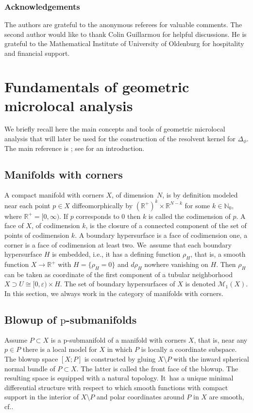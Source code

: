 \documentclass[11pt]{article}
\newcommand{\ie}{i.e.,\xspace}
\newcommand{\cf}{cf.\xspace}
\numberwithin{equation}{section}
\let\backslash\setminus
\newcommand{\rp}{\mathrm{p}}
\theoremstyle{plain}
\theoremstyle{definition}
\newcommand{\R}{{\mathbb{R}}}
\newcommand\calM{{\mathcal M}}
\let\eps\varepsilon
\begin{document}
\subsubsection*{Acknowledgements}
The authors are grateful to the anonymous referees for valuable comments. The second author would like to thank Colin Guillarmou
for helpful discussions. He is grateful to the Mathematical Institute of University of Oldenburg for hospitality and financial support.

\section{Fundamentals of geometric microlocal analysis}\label{sec:fund}
We briefly recall here the main concepts and tools of geometric microlocal analysis that will later be used
for the construction of the resolvent kernel for $\Delta_{\phi}$. The main reference
is \cite{melrose1993atiyah}; see \cite{Gri:BBC} for an introduction.

\subsection{Manifolds with corners}
A compact manifold with corners $X$, of dimension~$N$, is by definition modeled near each point $p\in X$ diffeomorphically by
\hbox{$(\mathbb{R}^+)^{k}\times\mathbb{R}^{N-k}$} for some $k \in \mathbb{N}_0$, where $\R^+=[0,\infty)$.
If $p$ corresponds to $0$ then $k$ is called the codimension of $p$. A face of $X$, of codimension $k$, is the closure of a connected component of the set of points of codimension $k$. A boundary hypersurface is a face of codimension one, a corner is a face of codimension at least two.
We~assume that each boundary hypersurface $H$ is embedded, \ie it has a defining function $\rho_H$, that is, a smooth function $X\to\R^+$ with
$H = \{\rho_H = 0\}$ and $d\rho_H$ nowhere vanishing on $H$. Then $\rho_H$ can be taken as coordinate of
the first component of a tubular neighborhood $X\supset U\cong [0,\eps)\times H$.
The set of boundary hypersurfaces of $X$ is denoted $\calM_1(X)$.
In this section, we
always work in the category of manifolds with corners.

\subsection{Blowup of \texorpdfstring{$\rp$}{p}-submanifolds}
Assume $P \subset X$ is a p-submanifold of a manifold
with corners $X$, that is, near any $p\in P$ there is a local model for $X$ in which $P$ is locally a coordinate subspace. The blowup space $[X;P]$ is constructed by gluing
$X\backslash P$ with the inward spherical normal bundle of $P \subset X$. The latter is called the front face of the blowup.
The resulting space is equipped with a natural topology. It~has a unique minimal
differential structure with respect to which smooth functions with compact support in the
interior of $X\backslash P$ and polar coordinates around $P$ in $X$ are smooth, \cf \cite[\S 4.1]{melrose1993atiyah}.
\end{document}
